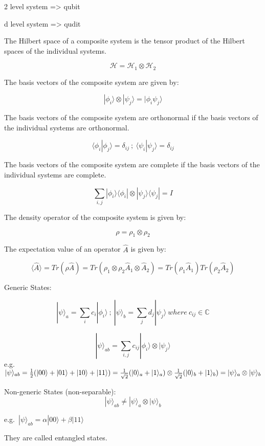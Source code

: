 \documentclass[
  letterpaper,
  DIV=11,
  numbers=noendperiod]{scrreprt}
\begin{document}
2 level system =\textgreater{} qubit

d level system =\textgreater{} qudit

The Hilbert space of a composite system is the tensor product of the
Hilbert spaces of the individual systems.

\[\mathcal{H} = \mathcal{H}_1 \otimes \mathcal{H}_2\]

The basis vectors of the composite system are given by:

\[|\phi_i\rangle \otimes |\psi_j\rangle = |\phi_i\psi_j\rangle\]

The basis vectors of the composite system are orthonormal if the basis
vectors of the individual systems are orthonormal.

\[\langle \phi_i | \phi_j \rangle = \delta_{ij}\ ;\ \langle \psi_i | \psi_j \rangle = \delta_{ij}\]

The basis vectors of the composite system are complete if the basis
vectors of the individual systems are complete.

\[\sum_{i,j} |\phi_i\rangle \langle \phi_i | \otimes |\psi_j\rangle \langle \psi_j | = I\]

The density operator of the composite system is given by:

\[\rho = \rho_1 \otimes \rho_2\]

The expectation value of an operator \(\hat{A}\) is given by:

\[\langle \hat{A} \rangle = Tr(\rho \hat{A}) = Tr(\rho_1 \otimes \rho_2 \hat{A}_1 \otimes \hat{A}_2) = Tr(\rho_1 \hat{A}_1) Tr(\rho_2 \hat{A}_2)\]

Generic States:

\[|\psi\rangle_a = \sum_{i} c_{i} |\phi_i\rangle\ ;\ |\psi\rangle_b = \sum_{j} d_{j} |\psi_j\rangle\
where\ c_{ij} \in \mathbb{C}\]

\[ |\psi\rangle_{ab} = \sum_{i,j} c_{ij} |\phi_i\rangle \otimes |\psi_j\rangle \]
e.g.~\(|\psi\rangle_{ab} = \frac{1}{2} (|00\rangle + |01\rangle + |10\rangle + |11\rangle)\\
= \frac{1}{\sqrt{2}} (|0\rangle_a + |1\rangle_a) \otimes \frac{1}{\sqrt{2}} (|0\rangle_b + |1\rangle_b)\\
= |\psi\rangle_a \otimes |\psi\rangle_b\)

Non-generic States (non-separable):
\[|\psi\rangle_{ab} \neq |\psi\rangle_a \otimes |\psi\rangle_b\]

e.g.~\(|\psi\rangle_{ab} = \alpha|00\rangle + \beta|11\rangle\)

They are called entangled states.
\end{document}
